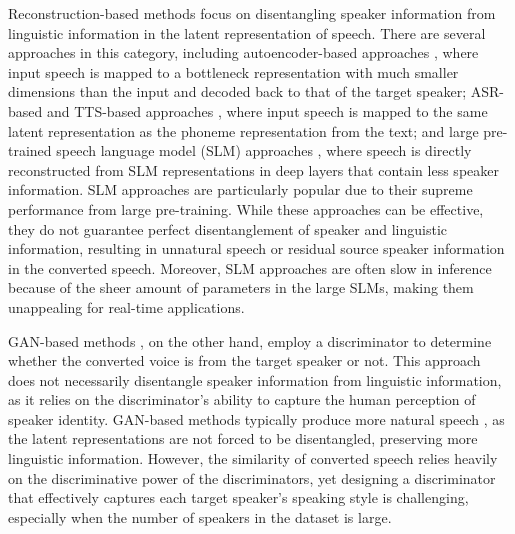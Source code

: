 \documentclass{article}
\begin{document}
\begin{sloppy}
Reconstruction-based methods focus on disentangling speaker information from linguistic information in the latent representation of speech. There are several approaches in this category, including autoencoder-based approaches \cite{qian2019autovc, yuan2021improving, wang2021vqmivc, chen2021again, lian2022robust}, where input speech is mapped to a bottleneck representation with much smaller dimensions than the input and decoded back to that of the target speaker; ASR-based and TTS-based approaches \cite{casanova2022yourtts, levkovitch2022zero, li2023styletts, hussain2023ace}, where input speech is mapped to the same latent representation as the phoneme representation from the text; and large pre-trained speech language model (SLM) approaches \cite{choi2021neural, qian2022contentvec, dang2022training}, where speech is directly reconstructed from SLM representations in deep layers that contain less speaker information. SLM approaches are particularly popular due to their supreme performance from large pre-training. While these approaches can be effective, they do not guarantee perfect disentanglement of speaker and linguistic information, resulting in unnatural speech or residual source speaker information in the converted speech. Moreover, SLM approaches are often slow in inference because of  the sheer amount of parameters in the large SLMs, making them unappealing for real-time applications.  

GAN-based methods \cite{zhang2020gazev, nguyen2022nvc, takahashi2022robust}, on the other hand, employ a discriminator to determine whether the converted voice is from the target speaker or not. This approach does not necessarily disentangle speaker information from linguistic information, as it relies on the discriminator's ability to capture the human perception of speaker identity. GAN-based methods typically produce more natural speech \cite{levkovitch2022zero, yasur2023deepfake}, as the latent representations are not forced to be disentangled, preserving more linguistic information. However, the similarity of converted speech relies heavily on the discriminative power of the discriminators, yet designing a discriminator that effectively captures each target speaker's speaking style is challenging, especially when the number of speakers in the dataset is large. 


\end{sloppy}
\end{document}
